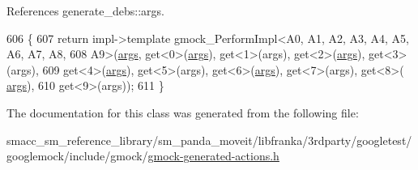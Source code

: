References generate\+\_\+debs\+::args.


\begin{DoxyCode}
606                                  \{
607     \textcolor{keywordflow}{return} impl->template gmock\_PerformImpl<A0, A1, A2, A3, A4, A5, A6, A7, A8,
608         A9>(\hyperlink{namespacegenerate__debs_a75f9143e38df82d83b2e8a6f99cae02c}{args}, get<0>(\hyperlink{namespacegenerate__debs_a75f9143e38df82d83b2e8a6f99cae02c}{args}), get<1>(args), get<2>(\hyperlink{namespacegenerate__debs_a75f9143e38df82d83b2e8a6f99cae02c}{args}), get<3>(args),
609         get<4>(\hyperlink{namespacegenerate__debs_a75f9143e38df82d83b2e8a6f99cae02c}{args}), get<5>(args), get<6>(\hyperlink{namespacegenerate__debs_a75f9143e38df82d83b2e8a6f99cae02c}{args}), get<7>(args), get<8>(
      \hyperlink{namespacegenerate__debs_a75f9143e38df82d83b2e8a6f99cae02c}{args}),
610         get<9>(args));
611   \}
\end{DoxyCode}


The documentation for this class was generated from the following file\+:\begin{DoxyCompactItemize}
\item 
smacc\+\_\+sm\+\_\+reference\+\_\+library/sm\+\_\+panda\+\_\+moveit/libfranka/3rdparty/googletest/googlemock/include/gmock/\hyperlink{gmock-generated-actions_8h}{gmock-\/generated-\/actions.\+h}\end{DoxyCompactItemize}
